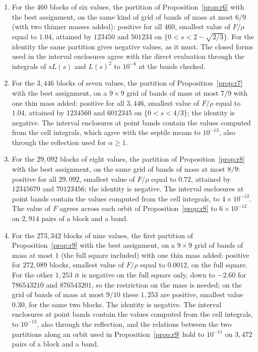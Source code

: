 \documentclass[11pt]{amsart}
\theoremstyle{definition}
\theoremstyle{remark}
\numberwithin{equation}{section}
\begin{document}
\begin{enumerate}[leftmargin=*]
positive for $24$ of the $25$ orbits and negative for the orbit of $12403$, which is why that orbit takes the $s$ then $v$
partition. For $12403$ the closed forms in the proof of Proposition~\ref{prop:r5} agree with the direct evaluation at
three bands.
\item For the $460$ blocks of six values, the partition of Proposition~\ref{prop:r6} with the best assignment, on the
same kind of grid of bands of mass at most $6/9$ (with two thinner masses added): positive for all $460$, smallest value of
$F/\rho$ equal to $1.04$, attained by $123450$ and $501234$ on $\{0<s<2-\sqrt{2/3}\}$. For the identity the same partition
gives negative values, as it must. The closed forms used in the interval enclosures agree with the direct evaluation
through the integrals of $sL(s)$ and $L(s)^2$ to $10^{-6}$ at the bands checked.
\item For the $3{,}446$ blocks of seven values, the partition of Proposition~\ref{prop:r7} with the best assignment, on a
$9\times9$ grid of bands of mass at most $7/9$ with one thin mass added: positive for all $3{,}446$, smallest value of
$F/\rho$ equal to $1.04$, attained by $1234560$ and $6012345$ on $\{0<s<4/3\}$; the identity is negative. The interval
enclosures at point bands contain the values computed from the cell integrals, which agree with the septile means to
$10^{-13}$, also through the reflection used for $\alpha\ge1$.
\item For the $29{,}092$ blocks of eight values, the partition of Proposition~\ref{prop:r8} with the best assignment, on
the same grid of bands of mass at most $8/9$: positive for all $29{,}092$, smallest value of $F/\rho$ equal to $0.72$,
attained by $12345670$ and $70123456$; the identity is negative. The interval enclosures at point bands contain the
values computed from the cell integrals, to $4\times10^{-13}$. The value of $F$ agrees across each orbit of
Proposition~\ref{prop:r8} to $6\times10^{-12}$ on $2{,}914$ pairs of a block and a band.
\item For the $273{,}342$ blocks of nine values, the first partition of Proposition~\ref{prop:r9} with the best
assignment, on a $9\times9$ grid of bands of mass at most $1$ (the full square included) with one thin mass added:
positive for $272{,}089$ blocks, smallest value of $F/\rho$ equal to $0.0012$, on the full square. For the other
$1{,}253$ it is negative on the full square only, down to $-2.60$ for $786543210$ and $876543201$, so the restriction on
the mass is needed; on the grid of bands of mass at most $9/10$ these $1{,}253$ are positive, smallest value $0.30$, for
the same two blocks. The identity is negative. The interval enclosures at point bands contain the values computed from the cell
integrals, to $10^{-13}$, also through the reflection, and the relations between the two partitions along an orbit used
in Proposition~\ref{prop:r9} hold to $10^{-11}$ on $3{,}472$ pairs of a block and a band.
\end{enumerate}
\end{document}
